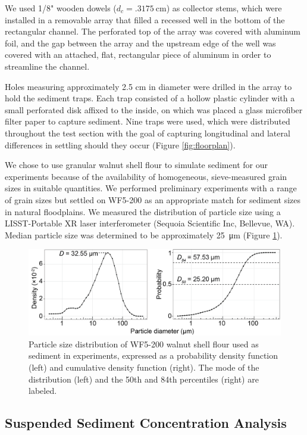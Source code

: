 \documentclass{scrreprt}
\begin{document}
We used 1/8" wooden dowels ($d_c = \SI{.3175}{\centi\metre}$) as collector stems, which were installed in a removable array that filled a recessed well in the bottom of the rectangular channel. The perforated top of the array was covered with aluminum foil, and the gap between the array and the upstream edge of the well was covered with an attached, flat, rectangular piece of aluminum in order to streamline the channel. 

Holes measuring approximately 2.5 cm in diameter were drilled in the array to hold the sediment traps. Each trap consisted of a hollow plastic cylinder with a small perforated disk affixed to the inside, on which was placed a glass microfiber filter paper to capture sediment. Nine traps were used, which were distributed throughout the test section with the goal of capturing longitudinal and lateral differences in settling should they occur (Figure \ref{fig:floorplan}).

We chose to use granular walnut shell flour to simulate sediment for our experiments because of the availability of homogeneous, sieve-measured grain sizes in suitable quantities. We performed preliminary experiments with a range of grain sizes but settled on WF5-200 as an appropriate match for sediment sizes in natural floodplains. We measured the distribution of particle size using a LISST-Portable XR laser interferometer (Sequoia Scientific Inc, Bellevue, WA). Median particle size was determined to be approximately \SI{25}{\micro\metre} (Figure \ref{fig:sedsize}).

\begin{figure}[htbp]
\includegraphics[width=15cm] {wf5-200sizedist.png}
\centering
\caption{Particle size distribution of WF5-200 walnut shell flour used as sediment in experiments, expressed as a probability density function (left) and cumulative density function (right). The mode of the distribution (left) and the 50th and 84th percentiles (right) are labeled.} 
\label{fig:sedsize}
\end{figure}

\subsection{Suspended Sediment Concentration Analysis}
\end{document}
